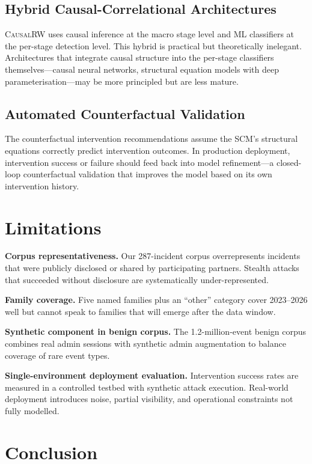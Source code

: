 \documentclass[sigconf,nonacm]{acmart}
\begin{document}
\subsection{Hybrid Causal-Correlational Architectures}

\textsc{CausalRW} uses causal inference at the macro stage level and
ML classifiers at the per-stage detection level. This hybrid is
practical but theoretically inelegant. Architectures that integrate
causal structure into the per-stage classifiers themselves---causal
neural networks, structural equation models with deep
parameterisation---may be more principled but are less mature.

\subsection{Automated Counterfactual Validation}

The counterfactual intervention recommendations assume the SCM's
structural equations correctly predict intervention outcomes. In
production deployment, intervention success or failure should feed
back into model refinement---a closed-loop counterfactual validation
that improves the model based on its own intervention history.

\section{Limitations}

\textbf{Corpus representativeness.} Our 287-incident corpus
overrepresents incidents that were publicly disclosed or shared by
participating partners. Stealth attacks that succeeded without
disclosure are systematically under-represented.

\textbf{Family coverage.} Five named families plus an ``other''
category cover 2023--2026 well but cannot speak to families that
will emerge after the data window.

\textbf{Synthetic component in benign corpus.} The 1.2-million-event
benign corpus combines real admin sessions with synthetic admin
augmentation to balance coverage of rare event types.

\textbf{Single-environment deployment evaluation.} Intervention
success rates are measured in a controlled testbed with synthetic
attack execution. Real-world deployment introduces noise, partial
visibility, and operational constraints not fully modelled.

\section{Conclusion}
\end{document}

